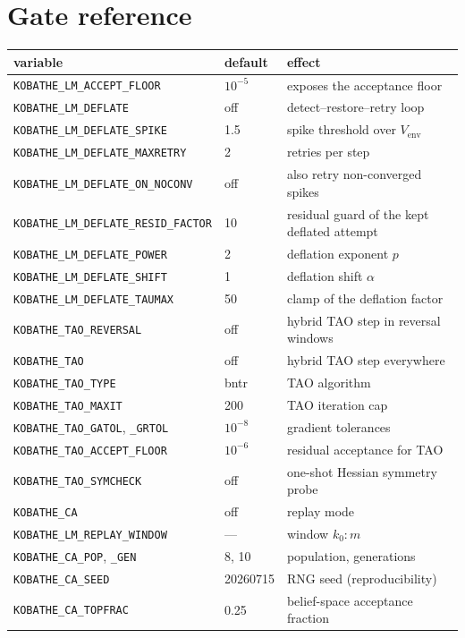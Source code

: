 \section{Gate reference}
\label{sec:drv-gates}

\begin{center}
\begin{tabular}{@{}lll@{}}
\toprule
variable & default & effect \\
\midrule
\texttt{KOBATHE\_LM\_ACCEPT\_FLOOR}      & $10^{-5}$ & exposes the acceptance floor \\
\texttt{KOBATHE\_LM\_DEFLATE}            & off       & detect--restore--retry loop \\
\texttt{KOBATHE\_LM\_DEFLATE\_SPIKE}     & 1.5       & spike threshold over $V_{\mathrm{env}}$ \\
\texttt{KOBATHE\_LM\_DEFLATE\_MAXRETRY}  & 2         & retries per step \\
\texttt{KOBATHE\_LM\_DEFLATE\_ON\_NOCONV} & off      & also retry non-converged spikes \\
\texttt{KOBATHE\_LM\_DEFLATE\_RESID\_FACTOR} & 10    & residual guard of the kept deflated attempt \\
\texttt{KOBATHE\_LM\_DEFLATE\_POWER}     & 2         & deflation exponent $p$ \\
\texttt{KOBATHE\_LM\_DEFLATE\_SHIFT}     & 1         & deflation shift $\alpha$ \\
\texttt{KOBATHE\_LM\_DEFLATE\_TAUMAX}    & 50        & clamp of the deflation factor \\
\texttt{KOBATHE\_TAO\_REVERSAL}          & off       & hybrid TAO step in reversal windows \\
\texttt{KOBATHE\_TAO}                    & off       & hybrid TAO step everywhere \\
\texttt{KOBATHE\_TAO\_TYPE}              & bntr      & TAO algorithm \\
\texttt{KOBATHE\_TAO\_MAXIT}             & 200       & TAO iteration cap \\
\texttt{KOBATHE\_TAO\_GATOL}, \texttt{\_GRTOL} & $10^{-8}$ & gradient tolerances \\
\texttt{KOBATHE\_TAO\_ACCEPT\_FLOOR}     & $10^{-6}$ & residual acceptance for TAO \\
\texttt{KOBATHE\_TAO\_SYMCHECK}          & off       & one-shot Hessian symmetry probe \\
\texttt{KOBATHE\_CA}                     & off       & replay mode \\
\texttt{KOBATHE\_LM\_REPLAY\_WINDOW}     & ---       & window $k_0{:}m$ \\
\texttt{KOBATHE\_CA\_POP}, \texttt{\_GEN} & 8, 10    & population, generations \\
\texttt{KOBATHE\_CA\_SEED}               & 20260715  & RNG seed (reproducibility) \\
\texttt{KOBATHE\_CA\_TOPFRAC}            & 0.25      & belief-space acceptance fraction \\
\bottomrule
\end{tabular}
\end{center}

